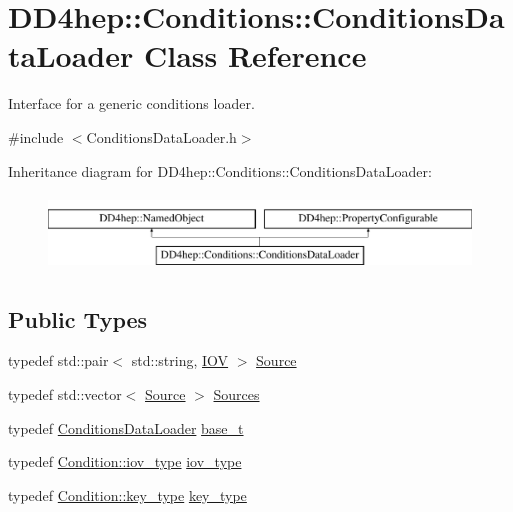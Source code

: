 \hypertarget{class_d_d4hep_1_1_conditions_1_1_conditions_data_loader}{}\section{D\+D4hep\+:\+:Conditions\+:\+:Conditions\+Data\+Loader Class Reference}
\label{class_d_d4hep_1_1_conditions_1_1_conditions_data_loader}


Interface for a generic conditions loader.  




{\ttfamily \#include $<$Conditions\+Data\+Loader.\+h$>$}

Inheritance diagram for D\+D4hep\+:\+:Conditions\+:\+:Conditions\+Data\+Loader\+:\begin{figure}[H]
\begin{center}
\leavevmode
\includegraphics[height=2.000000cm]{class_d_d4hep_1_1_conditions_1_1_conditions_data_loader}
\end{center}
\end{figure}
\subsection*{Public Types}
\begin{DoxyCompactItemize}
\item 
typedef std\+::pair$<$ std\+::string, \hyperlink{class_d_d4hep_1_1_i_o_v}{I\+OV} $>$ \hyperlink{class_d_d4hep_1_1_conditions_1_1_conditions_data_loader_acad32659f22e37a422ec6abdb4f95b3e}{Source}
\item 
typedef std\+::vector$<$ \hyperlink{class_d_d4hep_1_1_conditions_1_1_conditions_data_loader_acad32659f22e37a422ec6abdb4f95b3e}{Source} $>$ \hyperlink{class_d_d4hep_1_1_conditions_1_1_conditions_data_loader_a10469a47fdf0b7949194f79c35ee9510}{Sources}
\item 
typedef \hyperlink{class_d_d4hep_1_1_conditions_1_1_conditions_data_loader}{Conditions\+Data\+Loader} \hyperlink{class_d_d4hep_1_1_conditions_1_1_conditions_data_loader_a22a3a55163245ff24bca31db419433be}{base\+\_\+t}
\item 
typedef \hyperlink{class_d_d4hep_1_1_conditions_1_1_condition_ad84300e226b2085ec5e9db7f47be5539}{Condition\+::iov\+\_\+type} \hyperlink{class_d_d4hep_1_1_conditions_1_1_conditions_data_loader_a510aa9a02f5e798d8d96c9e3cb5a36af}{iov\+\_\+type}
\item 
typedef \hyperlink{class_d_d4hep_1_1_conditions_1_1_condition_a7528efa762e8cc072ef80ea67c3531f9}{Condition\+::key\+\_\+type} \hyperlink{class_d_d4hep_1_1_conditions_1_1_conditions_data_loader_ac17b71656c9d6b5365c62d1d606ba8cc}{key\+\_\+type}
\end{DoxyCompactItemize}
